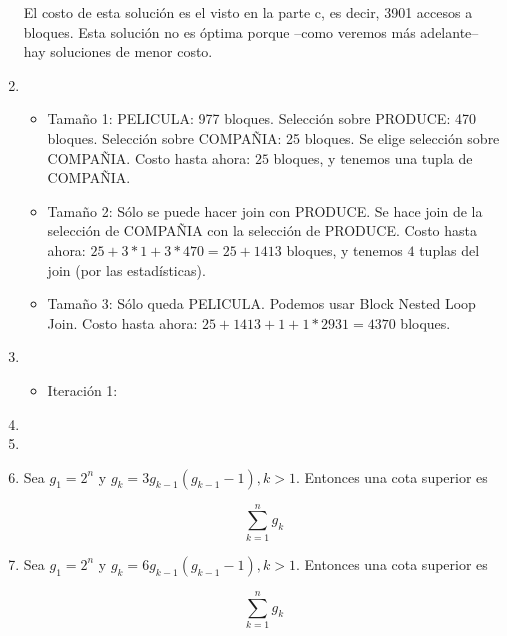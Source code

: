 \documentclass[10pt]{article}
\begin{document}
\begin{enumerate}
El costo de esta solución es el visto en la parte c, es decir, 3901 accesos a bloques.
Esta solución no es óptima porque --como veremos más adelante-- hay soluciones de menor costo.

 \item

\begin{itemize}
 \item Tamaño 1: PELICULA: 977 bloques. Selección sobre PRODUCE: 470 bloques. Selección sobre COMPAÑIA: 25 bloques.
       Se elige selección sobre COMPAÑIA. Costo hasta ahora: $25$ bloques, y tenemos una tupla de COMPAÑIA.
 \item Tamaño 2: Sólo se puede hacer join con PRODUCE. Se hace join de la selección de COMPAÑIA con la selección de PRODUCE.
       Costo hasta ahora: $25+3*1+3*470=25+1413$ bloques, y tenemos $4$ tuplas del join (por las estadísticas).
 \item Tamaño 3: Sólo queda PELICULA. Podemos usar Block Nested Loop Join. Costo hasta ahora: $25+1413+1+1*2931=4370$ bloques.
\end{itemize}

 \item

\begin{itemize}
 \item Iteración 1:
\end{itemize}

 \item

 \item

 \item

Sea $g_1 = 2^n$ y $g_k = 3g_{k-1}(g_{k-1}-1), k > 1$. Entonces una cota superior es

$$
\sum_{k=1}^n g_k
$$

 \item

Sea $g_1 = 2^n$ y $g_k = 6g_{k-1}(g_{k-1}-1), k > 1$. Entonces una cota superior es

$$
\sum_{k=1}^n g_k
$$

\end{enumerate}
\end{document}
